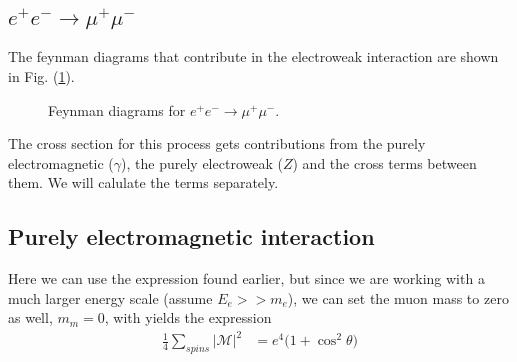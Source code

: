 \documentclass[11pt]{article}
\begin{document}
\subsection{$e^+ e^- \rightarrow \mu^+ \mu^-$}
\begin{flushleft}
The feynman diagrams that contribute in the electroweak interaction are shown in Fig. (\ref{fig:: ee- mu mu}).
\begin{figure}[H]
\centering
{}
\caption{Feynman diagrams for $e^+e^- \rightarrow \mu^+ \mu^-$.}
\label{fig:: ee- mu mu}
\end{figure}
The cross section for this process gets contributions from the purely electromagnetic ($\gamma$), the purely electroweak ($Z$) and the cross terms between them. We will calulate the terms separately. 
\end{flushleft}

\subsection{Purely electromagnetic interaction}

\begin{flushleft}
Here we can use the expression found earlier, but since we are working with a much larger energy scale (assume $E_e >> m_e$), we can set the muon mass to zero as well, $m_m = 0$, with yields the expression
\begin{align*}
\frac{1}{4} \sum_{spins} |\mathcal{M}|^2 
&= e^4 \big( 1 + \cos^2 \theta \big)
\end{align*}
\end{flushleft}
\end{document}
